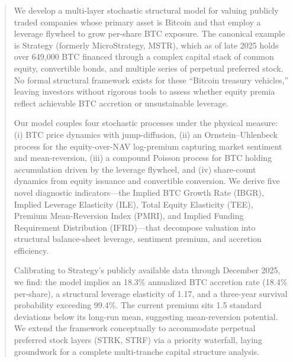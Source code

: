 \begin{abstract}
\noindent
We develop a multi-layer stochastic structural model for valuing publicly traded companies whose primary asset is Bitcoin and that employ a leverage flywheel to grow per-share BTC exposure. The canonical example is Strategy (formerly MicroStrategy, MSTR), which as of late 2025 holds over 649{,}000 BTC financed through a complex capital stack of common equity, convertible bonds, and multiple series of perpetual preferred stock. No formal structural framework exists for these ``Bitcoin treasury vehicles,'' leaving investors without rigorous tools to assess whether equity premia reflect achievable BTC accretion or unsustainable leverage.

Our model couples four stochastic processes under the physical measure: (i) BTC price dynamics with jump-diffusion, (ii) an Ornstein--Uhlenbeck process for the equity-over-NAV log-premium capturing market sentiment and mean-reversion, (iii) a compound Poisson process for BTC holding accumulation driven by the leverage flywheel, and (iv) share-count dynamics from equity issuance and convertible conversion. We derive five novel diagnostic indicators---the Implied BTC Growth Rate (IBGR), Implied Leverage Elasticity (ILE), Total Equity Elasticity (TEE), Premium Mean-Reversion Index (PMRI), and Implied Funding Requirement Distribution (IFRD)---that decompose valuation into structural balance-sheet leverage, sentiment premium, and accretion efficiency.

Calibrating to Strategy's publicly available data through December 2025, we find: the model implies an 18.3\% annualized BTC accretion rate (18.4\% per-share), a structural leverage elasticity of 1.17, and a three-year survival probability exceeding 99.4\%. The current premium sits 1.5 standard deviations below its long-run mean, suggesting mean-reversion potential. We extend the framework conceptually to accommodate perpetual preferred stock layers (STRK, STRF) via a priority waterfall, laying groundwork for a complete multi-tranche capital structure analysis.
\end{abstract}
